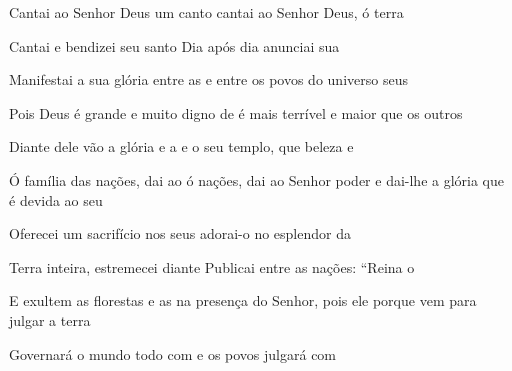 \begin{greenumerate}
  \item {}Cantai ao Senhor Deus um canto  cantai ao Senhor Deus, ó terra 

  \item {}Cantai e bendizei seu santo  Dia após dia anunciai sua 

  \item {}Manifestai a sua glória entre as  e entre os povos do universo seus 

  \item {}Pois Deus é grande e muito digno de  é mais terrível e maior que os outros 

  \item {}Diante dele vão a glória e a  e o seu templo, que beleza e 

  \item {}Ó família das nações, dai ao  ó nações, dai ao Senhor poder e  dai-lhe a glória que é devida ao seu 

  \item {}Oferecei um sacrifício nos seus  adorai-o no esplendor da 

  \item {}Terra inteira, estremecei diante  Publicai entre as nações: ``Reina o 

  \item {}E exultem as florestas e as  na presença do Senhor, pois ele  porque vem para julgar a terra 

  \item {}Governará o mundo todo com  e os povos julgará com 
\end{greenumerate}